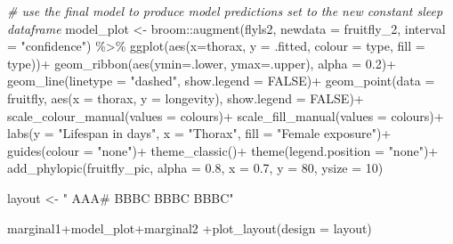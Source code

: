 \documentclass[
]{book}
\newenvironment{Shaded}{\begin{snugshade}}{\end{snugshade}}
\newcommand{\AttributeTok}[1]{\textcolor[rgb]{0.77,0.63,0.00}{#1}}
\newcommand{\CommentTok}[1]{\textcolor[rgb]{0.56,0.35,0.01}{\textit{#1}}}
\newcommand{\ConstantTok}[1]{\textcolor[rgb]{0.00,0.00,0.00}{#1}}
\newcommand{\DecValTok}[1]{\textcolor[rgb]{0.00,0.00,0.81}{#1}}
\newcommand{\FloatTok}[1]{\textcolor[rgb]{0.00,0.00,0.81}{#1}}
\newcommand{\FunctionTok}[1]{\textcolor[rgb]{0.00,0.00,0.00}{#1}}
\newcommand{\NormalTok}[1]{#1}
\newcommand{\OtherTok}[1]{\textcolor[rgb]{0.56,0.35,0.01}{#1}}
\newcommand{\SpecialCharTok}[1]{\textcolor[rgb]{0.00,0.00,0.00}{#1}}
\newcommand{\StringTok}[1]{\textcolor[rgb]{0.31,0.60,0.02}{#1}}
\begin{document}
\begin{Shaded}
\begin{Highlighting}[]
\CommentTok{\# use the final model to produce model predictions set to the new constant sleep dataframe}
\NormalTok{model\_plot }\OtherTok{\textless{}{-}}\NormalTok{ broom}\SpecialCharTok{::}\FunctionTok{augment}\NormalTok{(flyls2, }\AttributeTok{newdata =}\NormalTok{ fruitfly\_2, }\AttributeTok{interval =} \StringTok{"confidence"}\NormalTok{) }\SpecialCharTok{\%\textgreater{}\%} 
  \FunctionTok{ggplot}\NormalTok{(}\FunctionTok{aes}\NormalTok{(}\AttributeTok{x=}\NormalTok{thorax, }\AttributeTok{y =}\NormalTok{ .fitted, }\AttributeTok{colour =}\NormalTok{ type, }\AttributeTok{fill =}\NormalTok{ type))}\SpecialCharTok{+}
  \FunctionTok{geom\_ribbon}\NormalTok{(}\FunctionTok{aes}\NormalTok{(}\AttributeTok{ymin=}\NormalTok{.lower, }\AttributeTok{ymax=}\NormalTok{.upper), }\AttributeTok{alpha =} \FloatTok{0.2}\NormalTok{)}\SpecialCharTok{+}
    \FunctionTok{geom\_line}\NormalTok{(}\AttributeTok{linetype =} \StringTok{"dashed"}\NormalTok{, }\AttributeTok{show.legend =} \ConstantTok{FALSE}\NormalTok{)}\SpecialCharTok{+}
  \FunctionTok{geom\_point}\NormalTok{(}\AttributeTok{data =}\NormalTok{ fruitfly, }\FunctionTok{aes}\NormalTok{(}\AttributeTok{x =}\NormalTok{ thorax, }\AttributeTok{y =}\NormalTok{ longevity),}
             \AttributeTok{show.legend =} \ConstantTok{FALSE}\NormalTok{)}\SpecialCharTok{+}
  \FunctionTok{scale\_colour\_manual}\NormalTok{(}\AttributeTok{values =}\NormalTok{ colours)}\SpecialCharTok{+}
  \FunctionTok{scale\_fill\_manual}\NormalTok{(}\AttributeTok{values =}\NormalTok{ colours)}\SpecialCharTok{+}
  \FunctionTok{labs}\NormalTok{(}\AttributeTok{y =} \StringTok{"Lifespan in days"}\NormalTok{,}
       \AttributeTok{x =} \StringTok{"Thorax"}\NormalTok{,}
       \AttributeTok{fill =} \StringTok{"Female exposure"}\NormalTok{)}\SpecialCharTok{+}
  \FunctionTok{guides}\NormalTok{(}\AttributeTok{colour =} \StringTok{"none"}\NormalTok{)}\SpecialCharTok{+}
  \FunctionTok{theme\_classic}\NormalTok{()}\SpecialCharTok{+}
  \FunctionTok{theme}\NormalTok{(}\AttributeTok{legend.position =} \StringTok{"none"}\NormalTok{)}\SpecialCharTok{+}
  \FunctionTok{add\_phylopic}\NormalTok{(fruitfly\_pic, }\AttributeTok{alpha =} \FloatTok{0.8}\NormalTok{, }\AttributeTok{x =} \FloatTok{0.7}\NormalTok{, }\AttributeTok{y =} \DecValTok{80}\NormalTok{, }\AttributeTok{ysize =} \DecValTok{10}\NormalTok{)}



\NormalTok{layout }\OtherTok{\textless{}{-}} \StringTok{"}
\StringTok{AAA\#}
\StringTok{BBBC}
\StringTok{BBBC}
\StringTok{BBBC"}


\NormalTok{marginal1}\SpecialCharTok{+}\NormalTok{model\_plot}\SpecialCharTok{+}\NormalTok{marginal2 }\SpecialCharTok{+}\FunctionTok{plot\_layout}\NormalTok{(}\AttributeTok{design =}\NormalTok{ layout)}
\end{Highlighting}
\end{Shaded}
\end{document}
